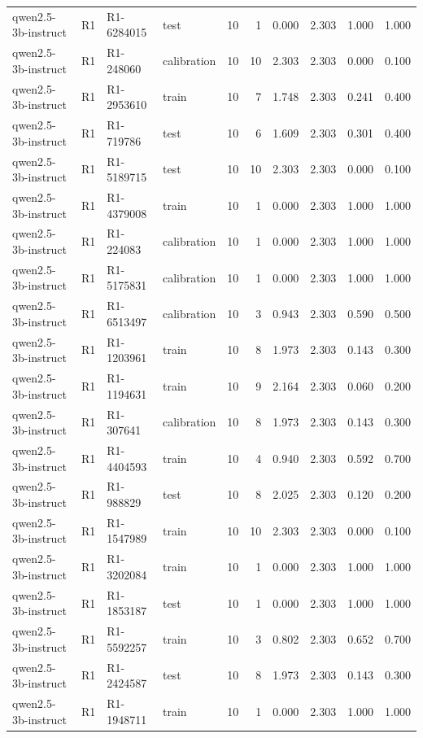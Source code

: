 \begin{table}
\begin{tabular}{llllrrrrrr}
qwen2.5-3b-instruct & R1 & R1-6284015 & test & 10 & 1 & 0.000 & 2.303 & 1.000 & 1.000 \\
qwen2.5-3b-instruct & R1 & R1-248060 & calibration & 10 & 10 & 2.303 & 2.303 & 0.000 & 0.100 \\
qwen2.5-3b-instruct & R1 & R1-2953610 & train & 10 & 7 & 1.748 & 2.303 & 0.241 & 0.400 \\
qwen2.5-3b-instruct & R1 & R1-719786 & test & 10 & 6 & 1.609 & 2.303 & 0.301 & 0.400 \\
qwen2.5-3b-instruct & R1 & R1-5189715 & test & 10 & 10 & 2.303 & 2.303 & 0.000 & 0.100 \\
qwen2.5-3b-instruct & R1 & R1-4379008 & train & 10 & 1 & 0.000 & 2.303 & 1.000 & 1.000 \\
qwen2.5-3b-instruct & R1 & R1-224083 & calibration & 10 & 1 & 0.000 & 2.303 & 1.000 & 1.000 \\
qwen2.5-3b-instruct & R1 & R1-5175831 & calibration & 10 & 1 & 0.000 & 2.303 & 1.000 & 1.000 \\
qwen2.5-3b-instruct & R1 & R1-6513497 & calibration & 10 & 3 & 0.943 & 2.303 & 0.590 & 0.500 \\
qwen2.5-3b-instruct & R1 & R1-1203961 & train & 10 & 8 & 1.973 & 2.303 & 0.143 & 0.300 \\
qwen2.5-3b-instruct & R1 & R1-1194631 & train & 10 & 9 & 2.164 & 2.303 & 0.060 & 0.200 \\
qwen2.5-3b-instruct & R1 & R1-307641 & calibration & 10 & 8 & 1.973 & 2.303 & 0.143 & 0.300 \\
qwen2.5-3b-instruct & R1 & R1-4404593 & train & 10 & 4 & 0.940 & 2.303 & 0.592 & 0.700 \\
qwen2.5-3b-instruct & R1 & R1-988829 & test & 10 & 8 & 2.025 & 2.303 & 0.120 & 0.200 \\
qwen2.5-3b-instruct & R1 & R1-1547989 & train & 10 & 10 & 2.303 & 2.303 & 0.000 & 0.100 \\
qwen2.5-3b-instruct & R1 & R1-3202084 & train & 10 & 1 & 0.000 & 2.303 & 1.000 & 1.000 \\
qwen2.5-3b-instruct & R1 & R1-1853187 & test & 10 & 1 & 0.000 & 2.303 & 1.000 & 1.000 \\
qwen2.5-3b-instruct & R1 & R1-5592257 & train & 10 & 3 & 0.802 & 2.303 & 0.652 & 0.700 \\
qwen2.5-3b-instruct & R1 & R1-2424587 & test & 10 & 8 & 1.973 & 2.303 & 0.143 & 0.300 \\
qwen2.5-3b-instruct & R1 & R1-1948711 & train & 10 & 1 & 0.000 & 2.303 & 1.000 & 1.000 \\

\end{tabular}
\end{table}
